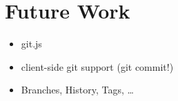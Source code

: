 \section{Future Work}
\label{sec:Future_Work}

\begin{itemize}
	\item git.js
	\item client-side git support (git commit!)
	\item Branches, History, Tags, \dots
\end{itemize}